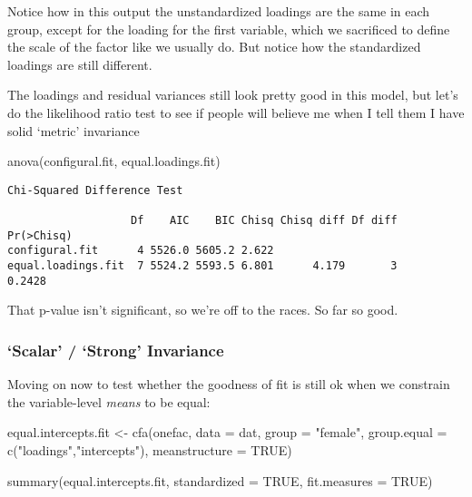 \documentclass[
  letterpaper,
  DIV=11,
  numbers=noendperiod]{scrreprt}
\newenvironment{Shaded}{\begin{snugshade}}{\end{snugshade}}
\newcommand{\AttributeTok}[1]{\textcolor[rgb]{0.40,0.45,0.13}{#1}}
\newcommand{\ConstantTok}[1]{\textcolor[rgb]{0.56,0.35,0.01}{#1}}
\newcommand{\FunctionTok}[1]{\textcolor[rgb]{0.28,0.35,0.67}{#1}}
\newcommand{\NormalTok}[1]{\textcolor[rgb]{0.00,0.23,0.31}{#1}}
\newcommand{\OtherTok}[1]{\textcolor[rgb]{0.00,0.23,0.31}{#1}}
\newcommand{\StringTok}[1]{\textcolor[rgb]{0.13,0.47,0.30}{#1}}
\begin{document}
Notice how in this output the unstandardized loadings are the same in
each group, except for the loading for the first variable, which we
sacrificed to define the scale of the factor like we usually do. But
notice how the standardized loadings are still different.

The loadings and residual variances still look pretty good in this
model, but let's do the likelihood ratio test to see if people will
believe me when I tell them I have solid `metric' invariance

\begin{Shaded}
\begin{Highlighting}[]
\FunctionTok{anova}\NormalTok{(configural.fit, equal.loadings.fit)}
\end{Highlighting}
\end{Shaded}

\begin{verbatim}
Chi-Squared Difference Test

                   Df    AIC    BIC Chisq Chisq diff Df diff Pr(>Chisq)
configural.fit      4 5526.0 5605.2 2.622                              
equal.loadings.fit  7 5524.2 5593.5 6.801      4.179       3     0.2428
\end{verbatim}

That p-value isn't significant, so we're off to the races. So far so
good.

\hypertarget{scalar-strong-invariance}{%
\subsubsection{`Scalar' / `Strong'
Invariance}\label{scalar-strong-invariance}}

Moving on now to test whether the goodness of fit is still ok when we
constrain the variable-level \emph{means} to be equal:

\begin{Shaded}
\begin{Highlighting}[]
\NormalTok{equal.intercepts.fit }\OtherTok{\textless{}{-}} \FunctionTok{cfa}\NormalTok{(onefac, }\AttributeTok{data =}\NormalTok{ dat, }\AttributeTok{group =} \StringTok{"female"}\NormalTok{, }
                            \AttributeTok{group.equal =} \FunctionTok{c}\NormalTok{(}\StringTok{"loadings"}\NormalTok{,}\StringTok{"intercepts"}\NormalTok{), }\AttributeTok{meanstructure =} \ConstantTok{TRUE}\NormalTok{)}

\FunctionTok{summary}\NormalTok{(equal.intercepts.fit, }\AttributeTok{standardized =} \ConstantTok{TRUE}\NormalTok{, }\AttributeTok{fit.measures =} \ConstantTok{TRUE}\NormalTok{)}
\end{Highlighting}
\end{Shaded}
\end{document}
